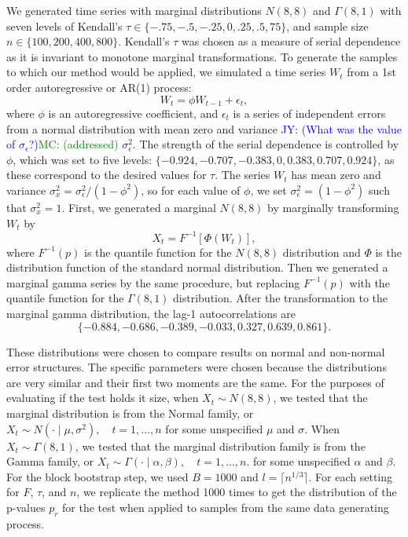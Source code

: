 \documentclass[12pt, titlepage, letterpaper]{article}
\newcommand{\jy}[1]{\textcolor{blue}{JY: (#1)}}
\newcommand{\mc}[1]{\textcolor{green}{MC: (#1)}}
\begin{document}
We generated time series with marginal distributions $N(8, 8)$ and
$\Gamma(8, 1)$ with seven levels of Kendall's
$\tau \in \{-.75, -.5, -.25, 0, .25, .5, 75\}$, and
sample size $n \in \{100, 200, 400, 800\}$. Kendall's $\tau$ was chosen as a
measure of serial dependence as it is invariant to monotone marginal
transformations. To generate the samples to which our
method would be applied, we simulated a time series $W_t$ from a 1st 
order autoregressive or AR(1) process:
\begin{equation*}
W_t = \phi W_{t-1} + \epsilon_t,
\end{equation*}
where $\phi$ is an autoregressive coefficient, and $\epsilon_t$ is a series of
independent errors from a normal distribution with mean zero and variance
\jy{What was the value of $\sigma_\epsilon$?}\mc{addressed}
$\sigma_{\epsilon}^2$. The strength of the serial dependence is controlled by
$\phi$, which was set to five levels: 
$\{-0.924, -0.707, -0.383, 0, 0.383, 0.707, 0.924\}$, as these
correspond to the desired values for $\tau$. The 
series $W_t$ has mean zero and variance 
$\sigma_x^2 = \sigma_{\epsilon}^2 / (1 - \phi^2)$, so for each value of
$\phi$, 
we 
set $\sigma_{\epsilon}^2 = (1 - \phi^2)$ such that $\sigma_x^2 = 1$.
First, we generated a
marginal $N(8, 8)$ by marginally transforming $W_t$ by
\begin{equation*}
X_t = F^{-1}[\Phi(W_t)],
\end{equation*}
where $F^{-1}(p)$ is the quantile function for the $N(8, 8)$ 
distribution and $\Phi$ is the distribution function of the standard normal
distribution.
Then we generated a marginal gamma series by the same procedure, but
replacing $F^{-1}(p)$ with the quantile function for the $\Gamma(8, 1)$
distribution.
After the transformation
to the marginal gamma distribution, the lag-1 autocorrelations are
\[
  \{-0.884, -0.686, -0.389, -0.033, 0.327, 0.639, 0.861\}.
\]


These distributions
were chosen to compare results on normal and non-normal
error structures. The specific parameters were chosen because the distributions 
are very similar and their
first two moments are the same. 
For the purposes of 
evaluating if the test holds it size, when $X_t \sim N(8, 8)$, we tested that the 
marginal distribution is from the
Normal family, or 
$X_t \sim N(\cdot \mid \mu, \sigma^2), \quad t = 1, \ldots, n$
for some unspecified $\mu$ and $\sigma$. When $X_t \sim \Gamma(8, 1)$, we tested
that the marginal distribution family is from the Gamma family,
or
$X_t \sim \Gamma(\cdot \mid \alpha, \beta), \quad t = 1, \ldots, n$.
for some unspecified $\alpha$ and $\beta$.
For the block
bootstrap step,
we used $B = 1000$ and $l = \lceil n^{1/3} \rceil$.
For each setting for $F$, $\tau$, and $n$, we replicate the method 1000 times 
to get the distribution of the p-values $p_r$
for the test when applied to samples from the same data generating process.
\end{document}
